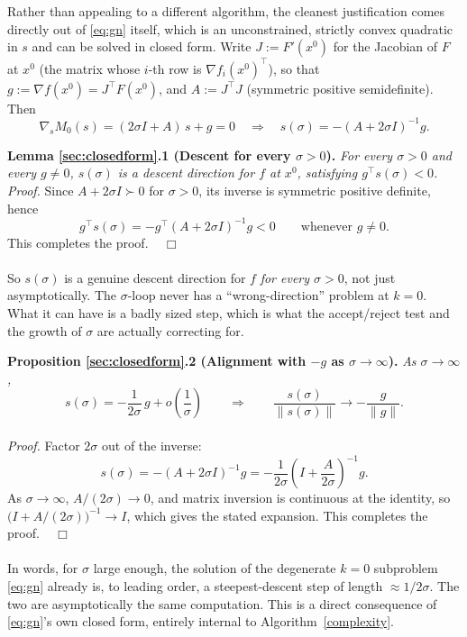 \documentclass[11pt]{article}
\newcommand{\norm}[1]{\|#1\|}
\newcommand{\halmos}    {\hfill $\;\;\;\Box$\\}
\begin{document}
Rather than appealing to a different algorithm, the cleanest justification
comes directly out of \eqref{eq:gn} itself, which is an unconstrained,
strictly convex quadratic in $s$ and can be solved in closed form. Write
$J:=F'(x^0)$ for the Jacobian of $F$ at $x^0$ (the matrix whose $i$-th row
is $\nabla f_i(x^0)^\top$), so that $g:=\nabla f(x^0)=J^\top F(x^0)$, and
$A:=J^\top J$ (symmetric positive semidefinite). Then
\[
\nabla_s M_0(s) = (2\sigma I + A)\,s + g = 0
\quad\Longrightarrow\quad
s(\sigma) = -(A+2\sigma I)^{-1} g.
\]

\noindent
{\bf Lemma \ref{sec:closedform}.1 (Descent for every $\sigma>0$).} {\it For every $\sigma>0$ and every $g\ne0$, $s(\sigma)$ is a descent direction
for $f$ at $x^0$, satisfying $g^\top s(\sigma) < 0$.
}\\

\noindent
{\it Proof.} Since $A+2\sigma I \succ 0$ for $\sigma>0$, its inverse is symmetric
positive definite, hence
\[
g^\top s(\sigma) = -g^\top (A+2\sigma I)^{-1} g < 0 \qquad \text{whenever } g\ne0.
\]
This completes the proof. \halmos\\
So $s(\sigma)$ is a genuine descent direction for $f$ \emph{for every
$\sigma>0$}, not just asymptotically. The $\sigma$-loop never has a
``wrong-direction'' problem at $k=0$. What it can have is a
badly sized step, which is what the accept/reject test and the
growth of $\sigma$ are actually correcting for.

\noindent
{\bf Proposition \ref{sec:closedform}.2 (Alignment with $-g$ as $\sigma\to\infty$).} {\it As $\sigma\to\infty$,
\begin{equation}
	s(\sigma) = -\frac{1}{2\sigma}\,g + o\!\left(\frac1\sigma\right)
	\qquad\Longrightarrow\qquad
	\frac{s(\sigma)}{\norm{s(\sigma)}} \longrightarrow -\frac{g}{\norm{g}}.
	\label{eq:asymptotic}
\end{equation}
}\\

\noindent
{\it Proof.} Factor $2\sigma$ out of the inverse:
\[
s(\sigma) = -(A+2\sigma I)^{-1}g
= -\frac{1}{2\sigma}\left(I + \frac{A}{2\sigma}\right)^{-1}g.
\]
As $\sigma\to\infty$, $A/(2\sigma)\to0$, and matrix inversion is
continuous at the identity, so $\bigl(I+A/(2\sigma)\bigr)^{-1}\to I$,
which gives the stated expansion. This completes the proof. \halmos\\

In words, for $\sigma$ large enough, the solution of the degenerate
$k=0$ subproblem \eqref{eq:gn} already is, to leading order, a
steepest-descent step of length $\approx1/2\sigma$. The two are
asymptotically the same computation. This is a direct consequence of
\eqref{eq:gn}'s own closed form, entirely internal to Algorithm~\ref{complexity}.
\end{document}
